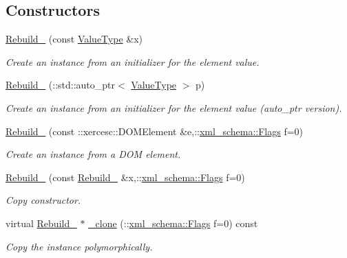 \subsection*{Constructors}
\begin{DoxyCompactItemize}
\item 
\hyperlink{classopenstack_1_1xml_1_1Rebuild___a13b56e126bbaf6fab552245f84172758}{Rebuild\_\-} (const \hyperlink{classopenstack_1_1xml_1_1Rebuild}{ValueType} \&x)
\begin{DoxyCompactList}\small\item\em Create an instance from an initializer for the element value. \item\end{DoxyCompactList}\item 
\hyperlink{classopenstack_1_1xml_1_1Rebuild___aad529a2d7b51534d4a5e4a6b890636b0}{Rebuild\_\-} (::std::auto\_\-ptr$<$ \hyperlink{classopenstack_1_1xml_1_1Rebuild}{ValueType} $>$ p)
\begin{DoxyCompactList}\small\item\em Create an instance from an initializer for the element value (auto\_\-ptr version). \item\end{DoxyCompactList}\item 
\hyperlink{classopenstack_1_1xml_1_1Rebuild___a8ebd56cea39c46fcd4a24b9f35a733d8}{Rebuild\_\-} (const ::xercesc::DOMElement \&e,::\hyperlink{namespacexml__schema_affb4c227cbd9aa7453dd1dc5a1401943}{xml\_\-schema::Flags} f=0)
\begin{DoxyCompactList}\small\item\em Create an instance from a DOM element. \item\end{DoxyCompactList}\item 
\hyperlink{classopenstack_1_1xml_1_1Rebuild___af4f020b7513e1d31138bf4032ada96ad}{Rebuild\_\-} (const \hyperlink{classopenstack_1_1xml_1_1Rebuild__}{Rebuild\_\-} \&x,::\hyperlink{namespacexml__schema_affb4c227cbd9aa7453dd1dc5a1401943}{xml\_\-schema::Flags} f=0)
\begin{DoxyCompactList}\small\item\em Copy constructor. \item\end{DoxyCompactList}\item 
virtual \hyperlink{classopenstack_1_1xml_1_1Rebuild__}{Rebuild\_\-} $\ast$ \hyperlink{classopenstack_1_1xml_1_1Rebuild___ad89d8a60b7ef5eace8525d04b52c7082}{\_\-clone} (::\hyperlink{namespacexml__schema_affb4c227cbd9aa7453dd1dc5a1401943}{xml\_\-schema::Flags} f=0) const 
\begin{DoxyCompactList}\small\item\em Copy the instance polymorphically. \item\end{DoxyCompactList}\end{DoxyCompactItemize}
